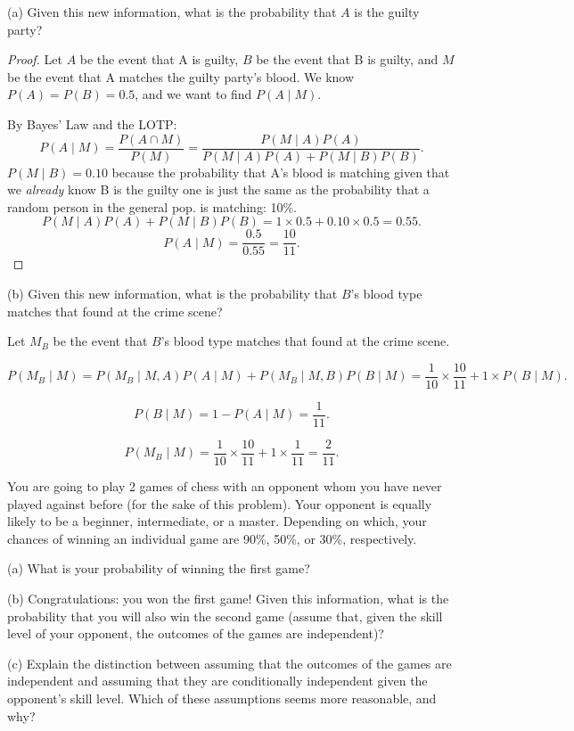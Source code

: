 \documentclass[10pt]{article}
\newenvironment{problem}[2][Problem]{\begin{trivlist}
\item[\hskip \labelsep {\bfseries #1}\hskip \labelsep {\bfseries #2.}]}{\end{trivlist}}
\begin{document}
(a) Given this new information, what is the probability that $A$ is the guilty
party?
\begin{proof}

Let $A$ be the event that A is guilty, $B$ be the event that B is guilty, and $M$ be the event that A matches the guilty party's blood. We know $P(A) = P(B) = 0.5$, and we want to find $P(A \mid M)$.

By Bayes' Law and the LOTP:
\[
    P(A \mid M) = \frac{P(A \cap M)}{P(M)} = \frac{P(M \mid A) P(A)}{P(M \mid A) P(A) + P(M \mid B) P(B)}.
\]
$P(M \mid B) = 0.10$ because the probability that A's blood is matching given that we \textit{already} know B is the guilty one is just the same as the probability that a random person in the general pop. is matching: 10\%.
\[
    P(M \mid A) P(A) + P(M \mid B) P(B) = 1 \times 0.5 + 0.10 \times 0.5 = 0.55.
\]
\[
    P(A \mid M) = \frac{0.5}{0.55} = \frac{10}{11}.
\]

\end{proof}
(b) Given this new information, what is the probability that $B$’s blood type
matches that found at the crime scene?

Let $M_B$ be the event that $B$’s blood type matches that found at the crime scene.

\[
    P(M_B \mid M) = P(M_B \mid M, A) P(A \mid M) + P(M_B \mid M, B) P(B \mid M) = \frac{1}{10} \times \frac{10}{11} + 1 \times P(B \mid M).
\]

\[
    P(B \mid M) = 1 - P(A \mid M) = \frac{1}{11}.
\]

\[
    P(M_B \mid M) = \frac{1}{10} \times \frac{10}{11} + 1 \times \frac{1}{11} = \frac{2}{11}.
\]
\begin{problem}{5}
You are going to play 2 games of chess with an opponent whom you have never
played against before (for the sake of this problem). Your opponent is equally
likely to be a beginner, intermediate, or a master. Depending on which, your
chances of winning an individual game are 90\%, 50\%, or 30\%, respectively.
\end{problem}

(a) What is your probability of winning the first game?

(b) Congratulations: you won the first game! Given this information, what is
the probability that you will also win the second game (assume that, given the
skill level of your opponent, the outcomes of the games are independent)?

(c) Explain the distinction between assuming that the outcomes of the games
are independent and assuming that they are conditionally independent given
the opponent’s skill level. Which of these assumptions seems more reasonable,
and why?
\end{document}
